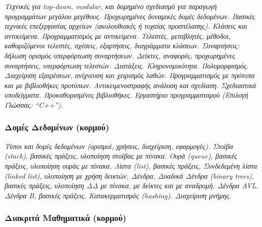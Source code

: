 \emph{Τεχνικές για top-down, modular, και δομημένο σχεδιασμό για
παραγωγή προγραμμάτων μεγάλου μεγέθους. Προχωρημένες δυναμικές δομές
δεδομένων. Βασικές τεχνικές επεξεργασίας αρχείων (ακολουθιακές ή τυχαίας
προσπέλασης). Κλάσεις και αντικείμενα. Προγραμματισμός με αντικείμενα.
Τελεστές, μεταβλητές, μέθοδοι, καθοριζόμενοι τελεστές, σχέσεις,
εξαρτήσεις, διαγράμματα κλάσεων. Συναρτήσεις: δήλωση ορισμός υπερφόρτωση
συναρτήσεων. Δείκτες, αναφορές, προχωρημένες συναρτήσεις, υπερφόρτωση
τελεστών. Διατάξεις. Κληρονομικότητα. Πολυμορφισμός. Διαχείριση
εξαιρέσεων, ανίχνευση και χειρισμός λαθών. Προγραμματισμός με πρότυπα
και με βιβλιοθήκες προτύπων. Αντικειμενοστραφής ανάλυση και σχεδίαση.
Σχεδιαστικά υποδείγματα. Προκαθορισμένες βιβλιοθήκες. Εργαστήριο
προγραμματισμού (Επιλογή Γλώσσας: ``C++'').}

\hypertarget{ux3b4ux3bfux3bcux3adux3c2-ux3b4ux3b5ux3b4ux3bfux3bcux3adux3bdux3c9ux3bd-ux3baux3bfux3c1ux3bcux3bfux3cd}{%
\subsubsection{Δομές Δεδομένων
(κορμού)}\label{ux3b4ux3bfux3bcux3adux3c2-ux3b4ux3b5ux3b4ux3bfux3bcux3adux3bdux3c9ux3bd-ux3baux3bfux3c1ux3bcux3bfux3cd}}

\emph{Τύποι και δομές δεδομένων (ορισμοί, χρήσεις, διαχείριση,
εφαρμογές). Στοίβα (stack), βασικές πράξεις, υλοποίηση στοίβας με
πίνακα. Ουρά (queue), βασικές πράξεις, υλοποίηση ουράς με πίνακα. Λίστα
(list), βασικές πράξεις, Συνδεδεμένη λίστα (linked list), υλοποίηση με
χρήση δεικτών, Δένδρα, Δυαδικά Δένδρα (binary trees), βασικές πράξεις,
υλοποίηση ΔΔ με πίνακα, με δείκτες και με αναδρομή. Δένδρα AVL. Δένδρα
Β, βασικές πράξεις. Κατακερματισμός (hashing). Διαχείριση μνήμης.}

\hypertarget{ux3b4ux3b9ux3b1ux3baux3c1ux3b9ux3c4ux3ac-ux3bcux3b1ux3b8ux3b7ux3bcux3b1ux3c4ux3b9ux3baux3ac-ux3baux3bfux3c1ux3bcux3bfux3cd}{%
\subsubsection{Διακριτά Μαθηματικά
(κορμού)}\label{ux3b4ux3b9ux3b1ux3baux3c1ux3b9ux3c4ux3ac-ux3bcux3b1ux3b8ux3b7ux3bcux3b1ux3c4ux3b9ux3baux3ac-ux3baux3bfux3c1ux3bcux3bfux3cd}}

